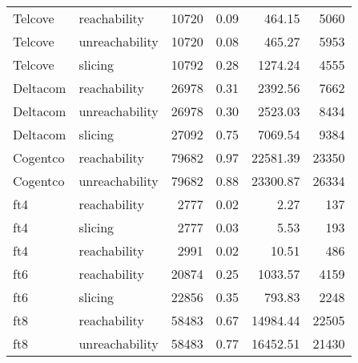 \begin{tabular}{llrrrr}
Telcove & reachability & 10720 & 0.09 & 464.15 & 5060 \\
Telcove & unreachability & 10720 & 0.08 & 465.27 & 5953 \\
Telcove & slicing & 10792 & 0.28 & 1274.24 & 4555 \\
Deltacom & reachability & 26978 & 0.31 & 2392.56 & 7662 \\
Deltacom & unreachability & 26978 & 0.30 & 2523.03 & 8434 \\
Deltacom & slicing & 27092 & 0.75 & 7069.54 & 9384 \\
Cogentco & reachability & 79682 & 0.97 & 22581.39 & 23350 \\
Cogentco & unreachability & 79682 & 0.88 & 23300.87 & 26334 \\
ft4 & reachability & 2777 & 0.02 & 2.27 & 137 \\
ft4 & slicing & 2777 & 0.03 & 5.53 & 193 \\
ft4 & reachability & 2991 & 0.02 & 10.51 & 486 \\
ft6 & reachability & 20874 & 0.25 & 1033.57 & 4159 \\
ft6 & slicing & 22856 & 0.35 & 793.83 & 2248 \\
ft8 & reachability & 58483 & 0.67 & 14984.44 & 22505 \\
ft8 & unreachability & 58483 & 0.77 & 16452.51 & 21430 \\
\bottomrule
\end{tabular}
